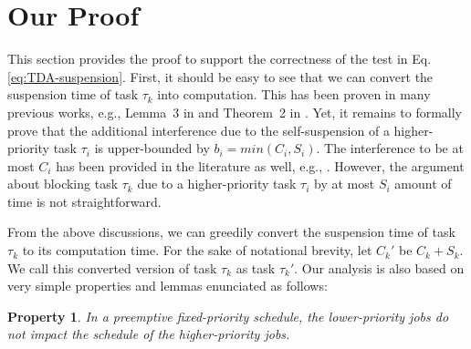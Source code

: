 \ifpaper
\newtheorem{Property}{Property}
\newtheorem{Lemma}{Lemma}
\newtheorem{Corollary}{Corollary}
\fi
\section{Our Proof}  

This section provides the proof to support the correctness of the test in Eq. \eqref{eq:TDA-suspension}. First, it should be easy to see that we can convert the suspension time of task $\tau_k$ into computation. This has been proven in many previous works, e.g., Lemma~3 in \cite{Liu_2014} and Theorem~2 in \cite{ecrts15nelissen}. Yet, it remains to formally prove that the additional interference due to the self-suspension of a higher-priority task $\tau_i$ is upper-bounded by $b_i=min(C_i, S_i)$. The interference to be at most $C_i$ has been provided in the literature as well, e.g., \cite{Rajkumar_1990,Liu_2014}. However, the argument about blocking task $\tau_k$ due to a higher-priority task $\tau_i$ by at most $S_i$ amount of time is not straightforward. 

From the above discussions, we can greedily convert the suspension time of task $\tau_k$ to its computation time. For the sake of notational brevity, let $C_k'$ be $C_k + S_k$. We call this converted version of task $\tau_k$ as task $\tau_k'$. Our analysis is also based on very simple properties and lemmas enunciated as follows:

\begin{Property}
\label{prop:lower-priority}
In a preemptive fixed-priority schedule, the lower-priority jobs do not impact the schedule of the higher-priority jobs.
\end{Property}


